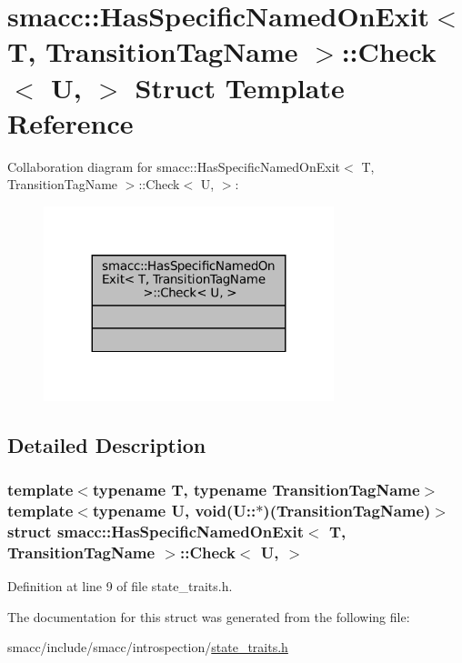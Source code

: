 \hypertarget{structsmacc_1_1HasSpecificNamedOnExit_1_1Check}{}\section{smacc\+:\+:Has\+Specific\+Named\+On\+Exit$<$ T, Transition\+Tag\+Name $>$\+:\+:Check$<$ U, $>$ Struct Template Reference}
\label{structsmacc_1_1HasSpecificNamedOnExit_1_1Check}


Collaboration diagram for smacc\+:\+:Has\+Specific\+Named\+On\+Exit$<$ T, Transition\+Tag\+Name $>$\+:\+:Check$<$ U, $>$\+:
\nopagebreak
\begin{figure}[H]
\begin{center}
\leavevmode
\includegraphics[width=239pt]{structsmacc_1_1HasSpecificNamedOnExit_1_1Check__coll__graph}
\end{center}
\end{figure}


\subsection{Detailed Description}
\subsubsection*{template$<$typename T, typename Transition\+Tag\+Name$>$\newline
template$<$typename U, void(\+U\+::$\ast$)(\+Transition\+Tag\+Name)$>$\newline
struct smacc\+::\+Has\+Specific\+Named\+On\+Exit$<$ T, Transition\+Tag\+Name $>$\+::\+Check$<$ U, $>$}



Definition at line 9 of file state\+\_\+traits.\+h.



The documentation for this struct was generated from the following file\+:\begin{DoxyCompactItemize}
\item 
smacc/include/smacc/introspection/\hyperlink{state__traits_8h}{state\+\_\+traits.\+h}\end{DoxyCompactItemize}
